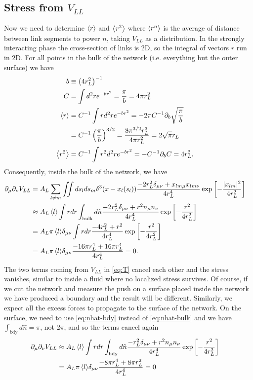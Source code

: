 \documentclass[linenumbers,endfloats,nofootinbib,preprint,floatfix,titlepage,superscriptaddress]{revtex4-1} %
\begin{document}
\subsection{Stress from $V_{LL}$}
Now we need to determine $\left<r\right>$ and $\left<r^2\right>$ where $\left<r^n\right>$ is the average of distance between link segments to power $n$, taking $V_{LL}$ as a distribution. 
In the strongly interacting phase the %
cross-section of links is 2D, so the integral of vectors $r$ run in 2D. 
For all points in the bulk of the network (i.e. everything but the outer surface) we have
\begin{align}
b &\equiv \left(4r_L^2\right)^{-1}\cr
C &= \int d^2 r e^{-br^2} = {\pi\over b} = 4\pi r_L^2 \cr
\left<r\right> &= C^{-1}\int r d^2 r e^{-br^2} = - 2\pi C^{-1}\partial_b \sqrt{{\pi\over b}} \cr &= C^{-1} \left({\pi\over b}\right)^{3/2}    = {8\pi^{3/2} r_L^3\over 4 \pi r_L^2} = 2\sqrt{\pi} r_L \cr
\left<r^2\right> &= C^{-1}\int r^2 d^2 r e^{-b r^2} = - C^{-1}\partial_b C = 4r_L^2.
\end{align}
%
Consequently, inside the bulk of the network, we have 
\begin{align}
    \partial_\mu\partial_\nu V_{LL} & = A_L\sum_{l\ne m} \iint ds_l ds_m \delta^3(x-x_l(s_l))\frac{-2r_L^2\delta_{\mu\nu}+ x_{lm\mu} x_{lm\nu}}{4r_L^4}
    \exp\left[- {|x_{lm}|^2 \over 4 r_L^2}\right]\cr 
    & \approx {A_L\left<l\right>} \int r dr \int_\mathrm{bulk} d\hat{n} \frac{-2r_L^2\delta_{\mu\nu}+ r^2 n_\mu n_\nu}{4r_L^4}
    \exp\left[- {r^2 \over 4 r_L^2}\right]\cr
    &= {A_L\pi\left<l\right>} \delta_{\mu\nu} \int r dr  \frac{-4 r_L^2+ r^2 }{4r_L^4}
    \exp\left[- {r^2 \over 4 r_L^2}\right]\cr
    &= {A_L\pi\left<l\right>} \delta_{\mu\nu}  \frac{-16\pi r_L^4+ 16\pi r_L^4 }{4r_L^4} = 0 .
    \label{eq:stress-bulk}
\end{align}
The two terms coming from $V_{LL}$ in \eqref{eq:T} cancel each other and the stress vanishes, similar to inside a fluid where no localized stress survives. 
Of course, if we cut the network and measure the push on a surface placed inside the network we have produced a boundary and the result will be different. 
Similarly, we expect all the excess forces to propagate to the surface of the network. 
On the surface, we need to use \eqref{eq:nhat-bdy}  instead of \eqref{eq:nhat-bulk} and we have $\int_\mathrm{bdy} d\hat{n} = \pi $, not $2\pi$, and so the terms cancel again
\begin{align}
    \ro_\mu\ro_\nu V_{LL} 
    & \approx {A_L\be{l}} \int r dr \int_\mathrm{bdy} d\hat{n} \frac{-r_L^2\delta_{\mu\nu}+ r^2 n_\mu n_\nu}{4r_L^4}
    \exp\left[- {r^2 \over 4 r_L^2}\right]\cr
    &= {A_L\pi\be{l}} \delta_{\mu\nu}  \frac{-8\pi r_L^4+ 8\pi r_L^2 }{4r_L^4} =0%
    \label{eq:stress-bdy}
\end{align}
\end{document}
